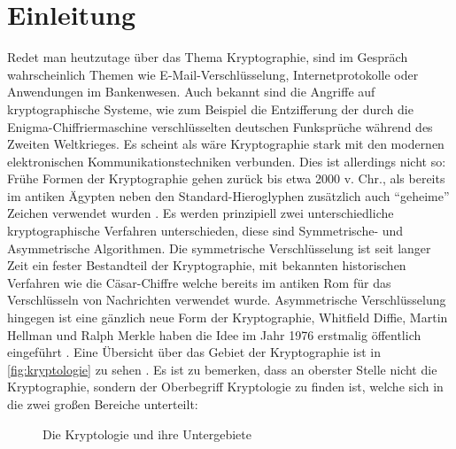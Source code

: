 \chapter{Einleitung}
Redet man heutzutage über das Thema Kryptographie, sind im Gespräch wahrscheinlich
Themen wie E-Mail-Verschlüsselung, Internetprotokolle oder Anwendungen im
Bankenwesen. Auch bekannt sind die Angriffe auf kryptographische Systeme,
wie zum Beispiel die Entzifferung der durch die Enigma-Chiffriermaschine
verschlüsselten deutschen Funksprüche während des Zweiten Weltkrieges. Es scheint als
wäre Kryptographie stark mit den modernen elektronischen Kommunikationstechniken
verbunden. Dies ist allerdings nicht so: Frühe Formen der Kryptographie
gehen zurück bis etwa 2000 v. Chr., als bereits im antiken Ägypten neben den
Standard-Hieroglyphen zusätzlich auch \enquote{geheime} Zeichen
verwendet wurden \parencite[2]{BOOK:KRYPTOGRAPHIE}. Es werden prinzipiell zwei
unterschiedliche kryptographische Verfahren unterschieden, diese sind
Symmetrische- und Asymmetrische Algorithmen. Die symmetrische Verschlüsselung ist
seit langer Zeit ein fester Bestandteil der Kryptographie, mit bekannten historischen
Verfahren wie die Cäsar-Chiffre welche bereits im antiken Rom für das Verschlüsseln von
Nachrichten verwendet wurde. Asymmetrische Verschlüsselung hingegen ist eine gänzlich neue Form
der Kryptographie, Whitfield Diffie, Martin Hellman und Ralph Merkle haben die Idee im Jahr
1976 erstmalig öffentlich eingeführt \parencite[3]{BOOK:KRYPTOGRAPHIE}.
Eine Übersicht über das Gebiet der Kryptographie ist in \autoref{fig:kryptologie}
zu sehen \parencite[3]{BOOK:KRYPTOGRAPHIE}.
Es ist zu bemerken, dass an oberster Stelle nicht die Kryptographie, sondern
der Oberbegriff Kryptologie zu finden ist, welche sich in die zwei großen Bereiche unterteilt:

\begin{figure}
\begin{center}


\end{center}
\caption{Die Kryptologie und ihre Untergebiete}
\label{fig:kryptologie}
\end{figure}


